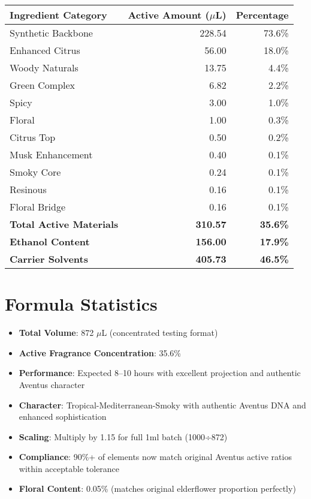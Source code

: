 \documentclass{article}
\begin{document}
\begin{table}[h]
\centering
\begin{tabular}{lrr}
\toprule
\textbf{Ingredient Category} & \textbf{Active Amount ($\mu$L)} & \textbf{Percentage} \\
\midrule
Synthetic Backbone & 228.54 & 73.6\% \\
Enhanced Citrus & 56.00 & 18.0\% \\
Woody Naturals & 13.75 & 4.4\% \\
Green Complex & 6.82 & 2.2\% \\
Spicy & 3.00 & 1.0\% \\
Floral & 1.00 & 0.3\% \\
Citrus Top & 0.50 & 0.2\% \\
Musk Enhancement & 0.40 & 0.1\% \\
Smoky Core & 0.24 & 0.1\% \\
Resinous & 0.16 & 0.1\% \\
Floral Bridge & 0.16 & 0.1\% \\
\midrule
\textbf{Total Active Materials} & \textbf{310.57} & \textbf{35.6\%} \\
\textbf{Ethanol Content} & \textbf{156.00} & \textbf{17.9\%} \\
\textbf{Carrier Solvents} & \textbf{405.73} & \textbf{46.5\%} \\
\bottomrule
\end{tabular}
\end{table}

\section{Formula Statistics}

\begin{itemize}
    \item \textbf{Total Volume}: 872 $\mu$L (concentrated testing format)
    \item \textbf{Active Fragrance Concentration}: 35.6\%
    \item \textbf{Performance}: Expected 8--10 hours with excellent projection and authentic Aventus character
    \item \textbf{Character}: Tropical-Mediterranean-Smoky with authentic Aventus DNA and enhanced sophistication
    \item \textbf{Scaling}: Multiply by 1.15 for full 1ml batch (1000÷872)
    \item \textbf{Compliance}: 90\%+ of elements now match original Aventus active ratios within acceptable tolerance
    \item \textbf{Floral Content}: 0.05\% (matches original elderflower proportion perfectly)
\end{itemize}
\end{document}

